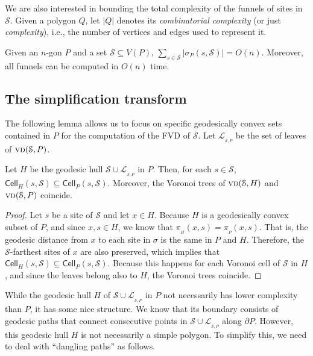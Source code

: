 \documentclass[a4paper,UKenglish]{socg-lipics-v2018}
\newcommand{\s}{\mathcal S}
\newcommand{\p}[3][P]{\ensuremath{\pi_{_{#1}}(#2, #3)}}
\newcommand{\funnel}[2][P]{\ensuremath{\sigma_{\scriptscriptstyle #1}(#2)}}
\newcommand{\cell}[2][P]{\ensuremath{\mathsf{Cell}_{\scriptscriptstyle #1}(#2)}}
\newcommand{\vd}[2][P]{\textsc{vd}(#2, #1)}
\newcommand{\LL}[1][\s, P]{\ensuremath{\mathcal L_{_{#1}}}}
\begin{document}
We are also interested in bounding the total complexity of the funnels of sites in $\s$.
Given a polygon $Q$, let $|Q|$ denotes its \emph{combinatorial complexity} (or just \emph{complexity}), i.e., the number of vertices and edges used to represent it. 

\begin{lemma}\label{lemma:Complexity of funnels}
Given an $n$-gon $P$ and a set $\s\subseteq V(P)$, $\sum_{s\in \s} |\funnel{s, \s}| = O(n)$.
Moreover, all funnels can be computed in $O(n)$ time. 
\end{lemma}

\subsection{The simplification transform}\label{section:Simplification}

The following lemma allows us to focus on specific geodesically convex sets contained in $P$ for the computation of the FVD of $\s$.
Let $\LL$ be the set of leaves of $\vd{\s}$.

\begin{lemma}\label{lemma:Voronoi coincides for geodesically convex subsets}
Let $H$ be the geodesic hull $\s\cup \LL$ in $P$.
Then, for each $s\in \s$, $\cell[H]{s, \s} \subseteq \cell{s, \s}$. Moreover, the Voronoi trees of $\vd[H]{\s}$ and $\vd{\s}$ coincide. 
\end{lemma}
\begin{proof}
Let $s$ be a site of $\s$ and let $x\in H$. 
Because $H$ is a geodesically convex subset of $P$, and since $x,s\in H$, we know that $\p[H]{x}{s} = \p{x}{s}$. 
That is, the geodesic distance from $x$  to each site in $\sigma$ is the same in $P$ and $H$. 
Therefore, the $\s$-farthest sites of $x$ are also preserved, which implies that $\cell[H]{s, \s} \subseteq \cell{s, \s}$. 
Because this happens for each Voronoi cell of $\s$ in $H$, and since the leaves belong also to $H$, the Voronoi trees coincide.
\end{proof}

While the geodesic hull $H$ of $\s\cup \LL$ in $P$ not necessarily has lower complexity than $P$, it has some nice structure. 
We know that its boundary consists of geodesic paths that connect consecutive points in $\s\cup \LL$ along $\partial P$.
However, this geodesic hull $H$ is not necessarily a simple polygon. 
To simplify this, we need to deal with ``dangling paths'' as follows.
\end{document}
